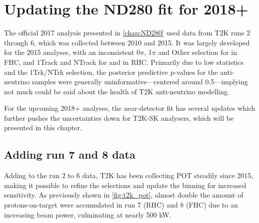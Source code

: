 \chapter{Updating the ND280 fit for 2018+}
The official 2017 analysis presented in \autoref{chap:ND280} used data from T2K runs 2 through 6, which was collected between 2010 and 2015. It was largely developed for the 2015 analyses, with an inconsistent 0$\pi$, 1$\pi$ and Other selection for \numu in FHC, and 1Track and NTrack for \numubar and \numu in RHC. Primarily due to low statistics and the 1Trk/NTrk selection, the posterior predictive p-values for the anti-neutrino samples were generally uninformative---centered around 0.5---implying not much could be said about the health of T2K anti-neutrino modelling.

For the upcoming 2018+ analyses, the near-detector fit has several updates which further pushes the uncertainties down for T2K-SK analysers, which will be presented in this chapter.

\section{Adding run 7 and 8 data}
Adding to the run 2 to 6 data, T2K has been collecting POT steadily since 2015, making it possible to refine the selections and update the binning for increased sensitivity. As previously shown in \autoref{fig:t2k_pot}, almost double the amount of protons-on-target were accumulated in run 7 (RHC) and 8 (FHC) due to an increasing beam power, culminating at nearly 500 kW.

